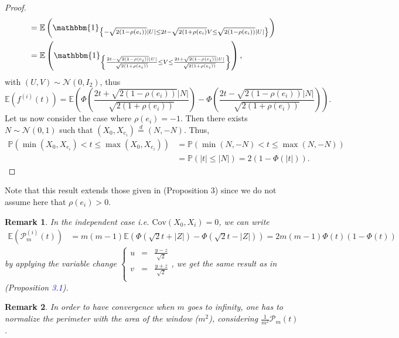 \documentclass[12pt]{article}
\theoremstyle{Theorem}
\newtheorem{remark}{Remark}
\begin{document}
\begin{proof}
{\begin{align*}
& = \mathbb{E}\left(\mathbbm{1}_{\left\{ - \sqrt{2(1-\rho(e_i))}\left|U\right| \leq 2t - \sqrt{2(1+\rho(e_i)}V \leq \sqrt{2(1-\rho(e_i))}\left|U\right| \right\}}\right) \\
& = \mathbb{E}\left(\mathbbm{1}_{\left\{\frac{2t - \sqrt{2(1-\rho(e_i))}|U|}{\sqrt{2(1+\rho(e_i))}}  \leq V \leq \frac{2t + \sqrt{2(1-\rho(e_i))}|U|}{\sqrt{2(1+\rho(e_i))}}\right\}}\right), 
\end{align*}}  
with $(U, V) \sim \mathcal{N}(0,I_{2})$, thus 
$$\mathbb{E}\left(f^{(i)}(t)\right) = \mathbb{E}\left(\Phi\left(\dfrac{2t + \sqrt{2(1-\rho(e_i))}|N|}{\sqrt{2(1+\rho(e_i))}}\right)  - \Phi\left(\dfrac{2t - \sqrt{2(1-\rho(e_i))}|N|}{\sqrt{2(1+\rho(e_i))}}\right)\right).$$
Let us now consider the case where $\rho(e_i) = -1$. Then there exists $N \sim \mathcal{N}\left(0,1\right)$ such that $\left(X_{\scriptscriptstyle 0}, X_{e_i}\right) \overset{d}{=} \left(N, -N\right)$. Thus, 
\begin{align*}
\mathbb{P}\left(\min\left(X_{\scriptscriptstyle 0}, X_{e_i}\right) < t \leq \max\left(X_{\scriptscriptstyle 0}, X_{e_i}\right)\right) & = \mathbb{P}\left(\min\left(N, -N\right) < t \leq \max\left(N, -N\right)\right) \\
& = \mathbb{P}\left(|t| \leq |N|\right) = 2\left(1 - \Phi\left(|t|\right)\right).
\end{align*}
\end{proof}
Note that this result extends those given in \cite{HermineAgnes} (Proposition 3) since we do not assume here that $\rho(e_i) > 0$. 
\begin{remark}
\label{iidCase}
In the independent case \textit{i.e.} $\text{Cov}\left(X_{0}, X_i\right) = 0$, we can write
{\small
\begin{align*}
\mathbb{E}\left(\mathcal{P}^{\scriptscriptstyle  (i)}_{m}(t) \right) & = m(m-1)\mathbb{E}\left(\Phi\left(\sqrt{2}t + |Z|\right) - \Phi\left(\sqrt{2}t - |Z|\right)\right) = 2m(m-1)\Phi(t)\left(1-\Phi(t)\right) 
\end{align*}}
by applying the variable change {\small$\left\{\begin{array}{rcl}
u & = & \frac{y - z}{\sqrt{2}} \\
v & = & \frac{y+z}{\sqrt{2}} \\
\end{array}\right.$}, we get the same result as in \cite{Psymetrie} (Proposition \textcolor{blue}{3.1}).
\end{remark}
\begin{remark}
In order to have convergence when $m$ goes to infinity, one has to normalize the perimeter with the area of the window ($m^2$), considering $\frac{1}{m^2}\mathcal{P}_{m}(t)$.
\end{remark}
\end{document}
